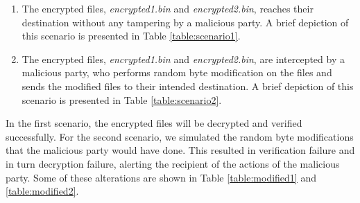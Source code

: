 \documentclass[a4paper]{cas-sc}
\begin{document}
\begin{enumerate}
    \item The encrypted files, \textit{encrypted1.bin} and \textit{encrypted2.bin}, reaches their destination without any tampering by a malicious party. A brief depiction of this scenario is presented in Table \ref{table:scenario1}.
    \item The encrypted files, \textit{encrypted1.bin} and \textit{encrypted2.bin}, are intercepted by a malicious party, who performs random byte modification on the files and sends the modified files to their intended destination. A brief depiction of this scenario is presented in Table \ref{table:scenario2}.
\end{enumerate}
In the first scenario, the encrypted files will be decrypted and verified successfully. For the second scenario, we simulated the random byte modifications that the malicious party would have done. This resulted in verification failure and in turn decryption failure, alerting the recipient of the actions of the malicious party. Some of these alterations are shown in Table \ref{table:modified1} and \ref{table:modified2}.
\end{document}
